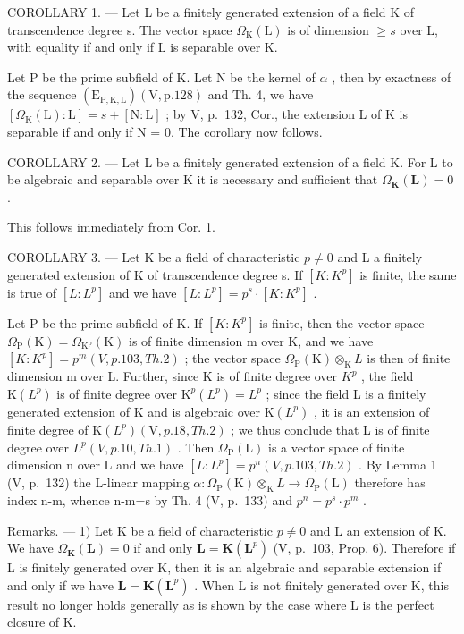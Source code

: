 COROLLARY 1. --- Let L be a finitely generated extension of a field K of transcendence degree s. The vector space \(\Omega_{\mathrm{K}}(\mathrm{L})\) is of dimension \(\geqslant s\) over L, with equality if and only if L is separable over K.

Let P be the prime subfield of K. Let N be the kernel of \(\alpha\) , then by exactness of the sequence \((\mathrm{E}_{\mathrm{P},\mathrm{K},\mathrm{L}})(\mathrm{V},\mathrm{p}.128)\) and Th. 4, we have \([\Omega_{\mathrm{K}}(\mathrm{L}):\mathrm{L}] = s + [\mathrm{N}:\mathrm{L}]\) ; by V, p.~132, Cor., the extension L of K is separable if and only if N = 0. The corollary now follows.

COROLLARY 2. --- Let L be a finitely generated extension of a field K. For L to be algebraic and separable over K it is necessary and sufficient that \(\Omega_{\mathbf{K}}(\mathbf{L}) = 0\) .

This follows immediately from Cor. 1.

COROLLARY 3. --- Let K be a field of characteristic \(p \neq 0\) and L a finitely generated extension of K of transcendence degree s. If \([K:K^{p}]\) is finite, the same is true of \([L:L^{p}]\) and we have \([L:L^{p}] = p^{s} \cdot [K:K^{p}]\) .

Let P be the prime subfield of K. If \([K:K^{p}]\) is finite, then the vector space \(\Omega_{\mathrm{P}}(\mathrm{K})=\Omega_{\mathrm{K}^{\mathrm{p}}}\left(\mathrm{K}\right)\) is of finite dimension m over K, and we have \([K:K^{p}]=p^{m}(V,p.103,Th.2)\) ; the vector space \(\Omega_{\mathrm{P}}(\mathrm{K})\otimes_{\mathrm{K}}L\) is then of finite dimension m over L. Further, since K is of finite degree over \(K^{p}\) , the field \(\mathrm{K}(L^{p})\) is of finite degree over \(\mathrm{K}^{p}(L^{p})=L^{p}\) ; since the field L is a finitely generated extension of K and is algebraic over \(\mathrm{K}(L^{p})\) , it is an extension of finite degree of \(\mathrm{K}(L^{p})(\mathrm{V},p.18,Th.2)\) ; we thus conclude that L is of finite degree over \(L^{p}(V,p.10,Th.1)\) . Then \(\Omega_{\mathrm{P}}(\mathrm{L})\) is a vector space of finite dimension n over L and we have \([L:L^{p}]=p^{n}(V,p.103,Th.2)\) . By Lemma 1 (V, p.~132) the L-linear mapping \(\alpha:\Omega_{\mathrm{P}}(\mathrm{K})\otimes_{\mathrm{K}}L\to\Omega_{\mathrm{P}}(\mathrm{L})\) therefore has index n-m, whence n-m=s by Th. 4 (V, p.~133) and \(p^{n}=p^{s}\cdot p^{m}\) .

Remarks. --- 1) Let K be a field of characteristic \(p \neq 0\) and L an extension of K. We have \(\Omega_{\mathbf{K}}(\mathbf{L}) = 0\) if and only \(\mathbf{L} = \mathbf{K}(\mathbf{L}^p)\) (V, p.~103, Prop. 6). Therefore if L is finitely generated over K, then it is an algebraic and separable extension if and only if we have \(\mathbf{L} = \mathbf{K}(\mathbf{L}^p)\) . When L is not finitely generated over K, this result no longer holds generally as is shown by the case where L is the perfect closure of K.

